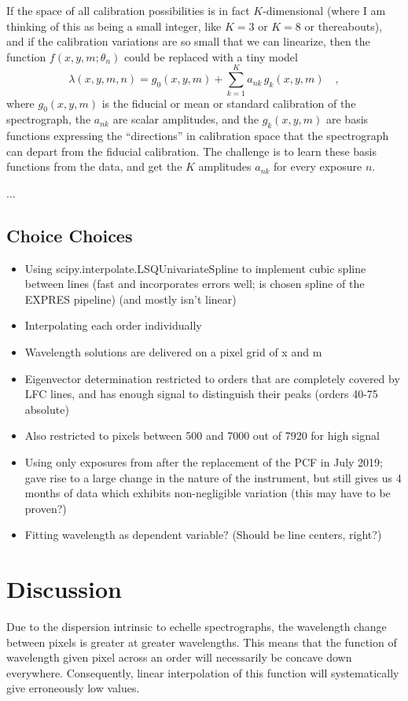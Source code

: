 \documentclass[12pt, letterpaper]{article}
\begin{document}
If the space of all calibration possibilities is in fact
$K$-dimensional (where I am thinking of this as being a small integer,
like $K=3$ or $K=8$ or thereabouts), and if the calibration variations are so
small that we can linearize, then the function $f(x,y,m;\theta_{n})$ could
be replaced with a tiny model
\begin{equation}
\lambda(x,y,m,n) = g_0(x,y,m) + \sum_{k=1}^K a_{nk}\,g_k(x,y,m)
\quad ,
\end{equation}
where
$g_0(x,y,m)$ is the fiducial or mean or standard calibration of the
spectrograph,
the $a_{nk}$ are scalar amplitudes,
and the $g_k(x,y,m)$ are basis functions expressing the ``directions''
in calibration space that the spectrograph can depart from the
fiducial calibration.
The challenge is to learn these basis functions from the data, and get
the $K$ amplitudes $a_{nk}$ for every exposure $n$.

...

\subsection{Choice Choices} \label{sec:choices}
\begin{itemize}
	\item Using scipy.interpolate.LSQUnivariateSpline to implement cubic spline between lines (fast and incorporates errors well; is chosen spline of the EXPRES pipeline) (and mostly isn't linear)
	\item Interpolating each order individually
	\item Wavelength solutions are delivered on a pixel grid of x and m
	\item Eigenvector determination restricted to orders that are completely covered by LFC lines, and has enough signal to distinguish their peaks (orders 40-75 absolute)
	\item Also restricted to pixels between 500 and 7000 out of 7920 for high signal
	\item Using only exposures from after the replacement of the PCF in July 2019; gave rise to a large change in the nature of the instrument, but still gives us 4 months of data which exhibits non-negligible variation (this may have to be proven?)
	\item Fitting wavelength as dependent variable?  (Should be line centers, right?)
\end{itemize}

\section{Discussion} \label{sec:discussion}

Due to the dispersion intrinsic to echelle spectrographs, the wavelength change between pixels is greater at greater wavelengths.  This means that the function of wavelength given pixel across an order will necessarily be concave down everywhere.  Consequently, linear interpolation of this function will systematically give erroneously low values.
\end{document}
